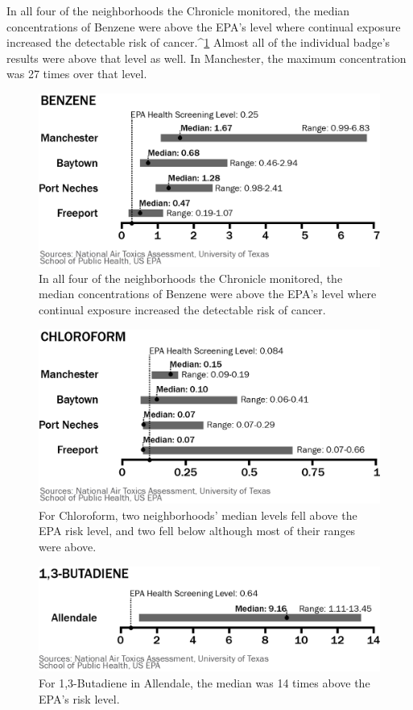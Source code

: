 In all four of the neighborhoods the Chronicle monitored, the median concentrations
of Benzene were above the EPA's level where continual exposure
increased the detectable risk of cancer.^{\href{#endnotes-houston-chronicle}{1}} Almost all of the individual badge's
results were above that level as well. In Manchester, the maximum concentration
was 27 times over that level.

    \begin{figure}
    \includegraphics{images/HoustonChronicleWhatWeFoundBenzene.png}
    \caption{In all four of the neighborhoods the Chronicle monitored, the median concentrations
of Benzene were above the EPA's level where continual exposure
increased the detectable risk of cancer.}
    \end{figure}

    \begin{figure}
    \includegraphics{images/HoustonChronicleWhatWeFoundChloroform.png}
    \caption{For Chloroform, two neighborhoods' median levels fell above the EPA risk
level, and two fell below although most of their ranges were above.}
    \end{figure}

    \begin{figure}
    \includegraphics{images/HoustonChronicleWhatWeFoundButadiene.png}
    \caption{For 1,3-Butadiene in Allendale, the median was 14 times above the EPA’s
risk level.}
    \end{figure}

